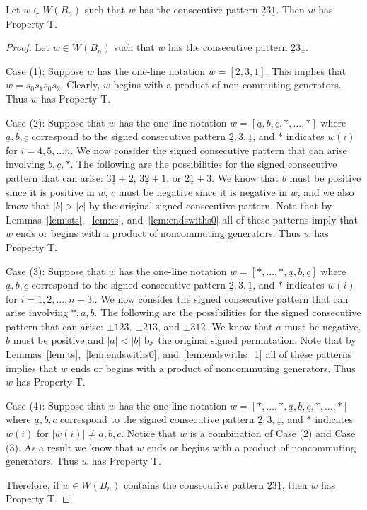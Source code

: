 \begin{lemma}\label{lem:2312}
Let $w \in W(B_n)$ such that $w$ has the consecutive pattern $\underline{2}3\underline{1}$. Then $w$ has Property T.
\begin{proof}
	Let $w \in W(B_n)$ such that $w$ has the consecutive pattern $\underline{2}3\underline{1}$.
	
	Case (1): Suppose $w$ has the one-line notation $w=[\underline{2},3,\underline{1}]$. This implies that $w=s_0s_1s_0s_2$. Clearly, $w$ begins with a product of non-commuting generators. Thus $w$ has Property T.
	
	Case (2): Suppose that $w$ has the one-line notation $w=[\underline{a},b,\underline{c}, \ast, \ldots, \ast]$ where $\underline{a},b,\underline{c}$ correspond to the signed consecutive pattern $\underline{2},3,\underline{1}$, and $\ast$ indicates $w(i)$ for $i=4,5, \ldots n$. We now consider the signed consecutive pattern that can arise involving $b,\underline{c}, \ast$. The following are the possibilities for the signed consecutive pattern that can arise: $3\underline{1}\pm2$, $3\underline{2} \pm1$, or $2\underline{1}\pm3$. We know that $b$ must be positive since it is positive in $w$, $c$ must be negative since it is negative in $w$, and we also know that $|b|>|c|$ by the original signed consecutive pattern. Note that by Lemmas~\ref{lem:sts},~\ref{lem:ts}, and~\ref{lem:endswiths0} all of these patterns imply that $w$ ends or begins with a product of noncommuting generators. Thus $w$ has Property T.
	
	Case (3): Suppose that $w$ has the one-line notation $w=[\ast, \ldots, \ast, \underline{a},b,\underline{c}]$ where $\underline{a},b,\underline{c}$ correspond to the signed consecutive pattern $\underline{2},3,\underline{1}$, and $\ast$ indicates $w(i)$ for $i=1,2, \ldots ,n-3$.. We now consider the signed consecutive pattern that can arise involving $\ast, \underline{a}, b$. The following are the possibilities for the signed consecutive pattern that can arise: $\pm1 \underline{2} 3$, $\pm 2 \underline{1} 3$, and $\pm 3 \underline{1} 2$. We know that $a$ must be negative, $b$ must be positive and $|a|<|b|$ by the original signed permutation. Note that by Lemmas~\ref{lem:ts},~\ref{lem:endswiths0}, and~\ref{lem:endswiths_1} all of these patterns implies that $w$ ends or begins with a product of noncommuting generators. Thus $w$ has Property T. 

	Case (4): Suppose that $w$ has the one-line notation $w=[\ast, \ldots,\ast, \underline{a},b,\underline{c}, \ast, \ldots, \ast]$ where $\underline{a},b,c$ correspond to the signed consecutive pattern $\underline{2},3,\underline{1}$, and $\ast$ indicates $w(i)$ for $|w(i)|\neq a,b,c$. Notice that $w$ is a combination of Case (2) and Case (3). As a result we know that $w$ ends or begins with a product of noncommuting generators. Thus $w$ has Property T.

	Therefore, if $w \in W(B_n)$ contains the consecutive pattern $\underline{2}3\underline{1}$, then $w$ has Property T.
\end{proof}	
\end{lemma}

